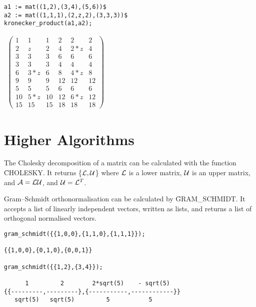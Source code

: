 \begin{verbatim}
a1 := mat((1,2),(3,4),(5,6))$
a2 := mat((1,1,1),(2,z,2),(3,3,3))$
kronecker_product(a1,a2);
\end{verbatim}
\begin{flushleft}
\hspace*{0.1in}
\begin{math}
\begin{array}{ccc}
\left( \begin{array}{cccccc} 1 & 1 & 1 & 2 & 2 & 2 \\
2 &  z & 2 & 4  &2*z &4 \\
3 &  3 & 3 & 6  & 6  &6 \\
3 &  3 & 3 & 4  & 4  &4 \\
6 & 3*z& 6 & 8  &4*z &8 \\
9 &  9 & 9 & 12 &12  &12\\
5 &  5 & 5 & 6  & 6  &6 \\
10 &5*z& 10& 12 &6*z &12 \\ 
15 &15 & 15& 18 &18  &18 \end{array} \right)
\end{array}
\end{math}
\end{flushleft}

\section{Higher Algorithms}

The Cholesky decomposition  of a matrix can be
calculated with the function \f{CHOLESKY}.  It returns \{${\cal
L,U}$\} where ${\cal L}$ is a lower matrix, ${\cal U}$ is an upper
matrix, and ${\cal A} = {\cal LU}$, and ${\cal U} = {\cal L}^T$. 

Gram--Schmidt orthonormalisation can be calculated by
\f{GRAM\_SCHMIDT}.  It accepts a list of
linearly independent vectors, written as lists, and returns a list of
orthogonal normalised vectors.

\begin{verbatim}
gram_schmidt({{1,0,0},{1,1,0},{1,1,1}});
 
{{1,0,0},{0,1,0},{0,0,1}}

gram_schmidt({{1,2},{3,4}});

      1         2        2*sqrt(5)    - sqrt(5)
{{---------,---------},{-----------,------------}}
   sqrt(5)   sqrt(5)         5           5
\end{verbatim}

